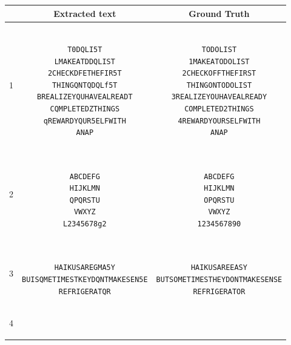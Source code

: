 \documentclass{article} %
\begin{document}
    \begin{tabular}{||c||c|c||}
        \hline\hline
        & Extracted text & Ground Truth \\
        \hline\hline 
        1 &
\begin{minipage}{0.4\textwidth}\begin{verbatim}

T0DQLI5T
LMAKEATDDQLIST
2CHECKDFETHEFIR5T
THINGQNTQDQLf5T
BREALIZEYQUHAVEALREADT
CQMPLETEDZTHINGS
qREWARDYQUR5ELFWITH
ANAP

\end{verbatim}\end{minipage}
        &
\begin{minipage}{0.4\textwidth}\begin{verbatim}

TODOLIST
1MAKEATODOLIST
2CHECKOFFTHEFIRST
THINGONTODOLIST
3REALIZEYOUHAVEALREADY
COMPLETED2THINGS
4REWARDYOURSELFWITH
ANAP

\end{verbatim}\end{minipage} \\
\hline
2 &
\begin{minipage}{0.4\textwidth}\begin{verbatim}

ABCDEFG
HIJKLMN
QPQRSTU
VWXYZ
L2345678g2

\end{verbatim}\end{minipage}
        &
\begin{minipage}{0.4\textwidth}\begin{verbatim}

ABCDEFG
HIJKLMN
OPQRSTU
VWXYZ
1234567890

\end{verbatim}\end{minipage} \\
\hline
3 &
\begin{minipage}{0.4\textwidth}\begin{verbatim}

HAIKUSAREGMA5Y
BUISQMETIMESTKEYDQNTMAKESEN5E
REFRIGERATQR

\end{verbatim}\end{minipage}
        &
\begin{minipage}{0.4\textwidth}\begin{verbatim}

HAIKUSAREEASY
BUTSOMETIMESTHEYDONTMAKESENSE
REFRIGERATOR

\end{verbatim}\end{minipage} \\
\hline
4 &
\begin{minipage}{0.4\textwidth}\begin{verbatim}


\end{verbatim}
\end{minipage}
\end{tabular}
\end{document}
